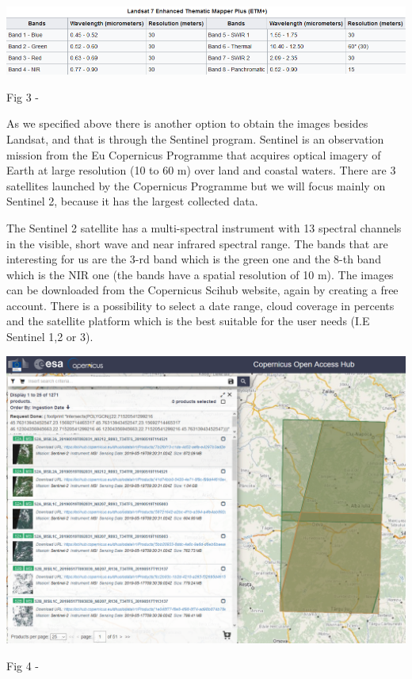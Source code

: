 \documentclass[12pt, a4paper]{report}
\begin{document}
\includegraphics[scale=0.73, center]{Capture.png} 
\begin{center}
Fig 3 - \cite{Wiki_landsat}
\end{center}


\medskip

As we specified above there is another option to obtain the images besides Landsat, and that is through the Sentinel program. Sentinel is an observation mission from the Eu Copernicus Programme that acquires optical imagery of Earth at large resolution (10 to 60 m) over land and coastal waters. There are 3 satellites launched by the Copernicus Programme but we will focus mainly on Sentinel 2, because it has the largest collected data. 
\par 

The Sentinel 2 satellite has a multi-spectral instrument with 13 spectral channels in the visible, short wave and near infrared spectral range. The bands that are interesting for us are the 3-rd band which is the green one and the 8-th band which is the NIR one (the bands have a spatial resolution of 10 m). The images  can be downloaded from the Copernicus Scihub website, again by creating a free account. There is a possibility to select a date range, cloud coverage in percents and the satellite platform which is the best suitable for the user needs (I.E Sentinel 1,2 or 3). 
\par 

\bigskip

\includegraphics[scale=0.54, center]{sentinel.png} 
\begin{center}
Fig 4 - \cite{Copernicus}
\end{center}
\par 
\end{document}

